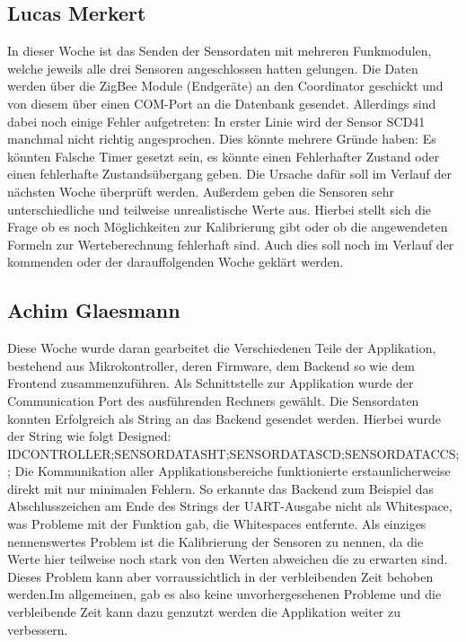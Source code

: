 \documentclass[]{article}
\begin{document}
\subsection{Lucas Merkert}
In dieser Woche ist das Senden der Sensordaten mit mehreren Funkmodulen, welche jeweils alle drei Sensoren angeschlossen hatten gelungen. Die Daten werden über die ZigBee Module (Endgeräte) an den Coordinator geschickt und von diesem über einen COM-Port an die Datenbank gesendet. Allerdings sind dabei noch einige Fehler aufgetreten: In erster Linie wird der Sensor SCD41 manchmal nicht richtig angesprochen. Dies könnte mehrere Gründe haben: Es könnten Falsche Timer gesetzt sein, es könnte einen Fehlerhafter Zustand oder einen fehlerhafte Zustandsübergang geben. Die Ursache dafür soll im Verlauf der nächsten Woche überprüft werden. Außerdem geben die Sensoren sehr unterschiedliche und teilweise unrealistische Werte aus. Hierbei stellt sich die Frage ob es noch Möglichkeiten zur Kalibrierung gibt oder ob die angewendeten Formeln zur Werteberechnung fehlerhaft sind. Auch dies soll noch im Verlauf der kommenden oder der darauffolgenden Woche geklärt werden.


\subsection{Achim Glaesmann}
Diese Woche wurde daran gearbeitet die Verschiedenen Teile der Applikation, bestehend aus Mikrokontroller, deren Firmware, dem Backend so wie dem Frontend zusammenzuführen. Als Schnittstelle zur Applikation wurde der Communication Port des ausführenden Rechners gewählt. Die Sensordaten konnten Erfolgreich als String an das Backend gesendet werden. Hierbei wurde der String wie folgt Designed: IDCONTROLLER;SENSORDATASHT;SENSORDATASCD;SENSORDATACCS;;
Die Kommunikation aller Applikationsbereiche funktionierte erstaunlicherweise direkt mit nur minimalen Fehlern. So erkannte das Backend zum Beispiel das Abschlusszeichen am Ende des Strings der UART-Ausgabe nicht als Whitespace, was Probleme mit der Funktion gab, die Whitespaces entfernte.
 Als einziges nennenswertes Problem ist die Kalibrierung der Sensoren zu nennen, da die Werte hier teilweise noch stark von den Werten abweichen die zu erwarten sind. Dieses Problem kann aber vorraussichtlich in der verbleibenden Zeit behoben werden.Im allgemeinen, gab es also keine unvorhergesehenen Probleme und die verbleibende Zeit kann dazu genzutzt werden die Applikation weiter zu verbessern.
\end{document}
